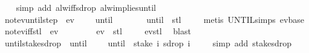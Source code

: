 \begin{isabellebody}
%
\isadelimproof
\ \ %
\endisadelimproof
%
\isatagproof
{}\isamarkupfalse%
\ {\isacharparenleft}simp\ add{\isacharcolon}\ alw{\isacharunderscore}iff{\isacharunderscore}sdrop\ alw{\isacharunderscore}implies{\isacharunderscore}until{\isacharparenright}%
\endisatagproof
{\isafoldproof}%
%
\isadelimproof
\isanewline
%
\endisadelimproof
\isanewline
{}\isamarkupfalse%
\ not{\isacharunderscore}ev{\isacharunderscore}until{\isacharunderscore}step{\isacharcolon}\ {\isachardoublequoteopen}{\isasymnot}\ ev\ {\isasympsi}\ {\isasymomega}\ {\isasymLongrightarrow}\ {\isacharparenleft}{\isasymphi}\ until\ {\isasympsi}{\isacharparenright}\ {\isasymomega}\ {\isacharequal}\ {\isacharparenleft}{\isasymphi}\ {\isasymomega}\ {\isasymand}\ {\isacharparenleft}{\isasymphi}\ until\ {\isasympsi}{\isacharparenright}\ {\isacharparenleft}stl\ {\isasymomega}{\isacharparenright}{\isacharparenright}{\isachardoublequoteclose}\isanewline
%
\isadelimproof
\ \ %
\endisadelimproof
%
\isatagproof
{}\isamarkupfalse%
\ {\isacharparenleft}metis\ UNTIL{\isachardot}simps\ ev{\isachardot}base{\isacharparenright}%
\endisatagproof
{\isafoldproof}%
%
\isadelimproof
\isanewline
%
\endisadelimproof
\isanewline
{}\isamarkupfalse%
\ not{\isacharunderscore}ev{\isacharunderscore}iff{\isacharunderscore}stl{\isacharcolon}\ {\isachardoublequoteopen}{\isacharparenleft}{\isasymnot}\ ev\ {\isasympsi}\ {\isasymomega}{\isacharparenright}\ {\isacharequal}\ {\isacharparenleft}{\isasymnot}\ {\isasympsi}\ {\isasymomega}\ {\isasymand}\ {\isasymnot}\ ev\ {\isasympsi}\ {\isacharparenleft}stl\ {\isasymomega}{\isacharparenright}{\isacharparenright}{\isachardoublequoteclose}\isanewline
%
\isadelimproof
\ \ %
\endisadelimproof
%
\isatagproof
{}\isamarkupfalse%
\ ev{\isacharunderscore}stl\ \isamarkupfalse%
\ blast%
\endisatagproof
{\isafoldproof}%
%
\isadelimproof
\isanewline
%
\endisadelimproof
\isanewline
{}\isamarkupfalse%
\ until{\isacharunderscore}stake{\isacharunderscore}sdrop{\isacharcolon}\ {\isachardoublequoteopen}{\isacharparenleft}{\isasymphi}\ until\ {\isasympsi}{\isacharparenright}\ {\isasymomega}\ {\isacharequal}\ {\isacharparenleft}{\isasymphi}\ until\ {\isasympsi}{\isacharparenright}\ {\isacharparenleft}{\isacharparenleft}stake\ i\ {\isasymomega}{\isacharparenright}{\isacharat}{\isacharminus}{\isacharparenleft}sdrop\ i\ {\isasymomega}{\isacharparenright}{\isacharparenright}{\isachardoublequoteclose}\isanewline
%
\isadelimproof
\ \ %
\endisadelimproof
%
\isatagproof
{}\isamarkupfalse%
\ {\isacharparenleft}simp\ add{\isacharcolon}\ stake{\isacharunderscore}sdrop{\isacharparenright}%

\end{isabellebody}
